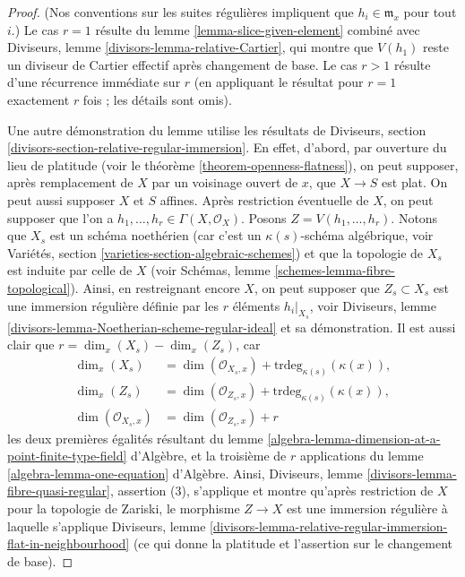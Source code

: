 \begin{proof}
(Nos conventions sur les suites régulières impliquent que $h_i \in \mathfrak m_x$
pour tout $i$.) Le cas $r = 1$ résulte du
lemme \ref{lemma-slice-given-element}
combiné avec
Diviseurs, lemme \ref{divisors-lemma-relative-Cartier},
qui montre que $V(h_1)$ reste un diviseur de Cartier effectif après changement de base.
Le cas $r > 1$ résulte d'une récurrence immédiate sur $r$ (en appliquant
le résultat pour $r = 1$ exactement $r$ fois ; les détails sont omis).

\medskip\noindent
Une autre démonstration du lemme utilise les résultats de
Diviseurs, section \ref{divisors-section-relative-regular-immersion}.
En effet, d'abord, par ouverture du lieu de platitude (voir le
théorème \ref{theorem-openness-flatness}),
on peut supposer, après remplacement de $X$ par un
voisinage ouvert de $x$, que $X \to S$ est plat.
On peut aussi supposer $X$ et $S$ affines.
Après restriction éventuelle de $X$, on peut supposer que l'on a
$h_1, \ldots, h_r \in \Gamma(X, \mathcal{O}_X)$. Posons
$Z = V(h_1, \ldots, h_r)$. Notons que $X_s$ est un schéma noethérien
(car c'est un $\kappa(s)$-schéma algébrique, voir
Variétés, section \ref{varieties-section-algebraic-schemes})
et que la topologie de $X_s$ est induite par celle de $X$
(voir
Schémas, lemme \ref{schemes-lemma-fibre-topological}).
Ainsi, en restreignant encore $X$,
on peut supposer que $Z_s \subset X_s$ est une immersion régulière
définie par les $r$ éléments $h_i|_{X_s}$, voir
Diviseurs, lemme \ref{divisors-lemma-Noetherian-scheme-regular-ideal}
et sa démonstration. Il est aussi clair que $r = \dim_x(X_s) - \dim_x(Z_s)$, car
\begin{align*}
\dim_x(X_s) & = \dim(\mathcal{O}_{X_s, x}) +
\text{trdeg}_{\kappa(s)}(\kappa(x)), \\
\dim_x(Z_s) & = \dim(\mathcal{O}_{Z_s, x}) +
\text{trdeg}_{\kappa(s)}(\kappa(x)), \\
\dim(\mathcal{O}_{X_s, x}) & = \dim(\mathcal{O}_{Z_s, x}) + r
\end{align*}
les deux premières égalités résultant du
lemme \ref{algebra-lemma-dimension-at-a-point-finite-type-field} d'Algèbre,
et la troisième de $r$ applications du
lemme \ref{algebra-lemma-one-equation} d'Algèbre.
Ainsi,
Diviseurs, lemme \ref{divisors-lemma-fibre-quasi-regular}, assertion (3),
s'applique et montre qu'après restriction de $X$ pour la topologie de Zariski, le morphisme
$Z \to X$ est une immersion régulière à laquelle s'applique
Diviseurs, lemme
\ref{divisors-lemma-relative-regular-immersion-flat-in-neighbourhood}
(ce qui donne la platitude et l'assertion sur le changement de base).
\end{proof}

